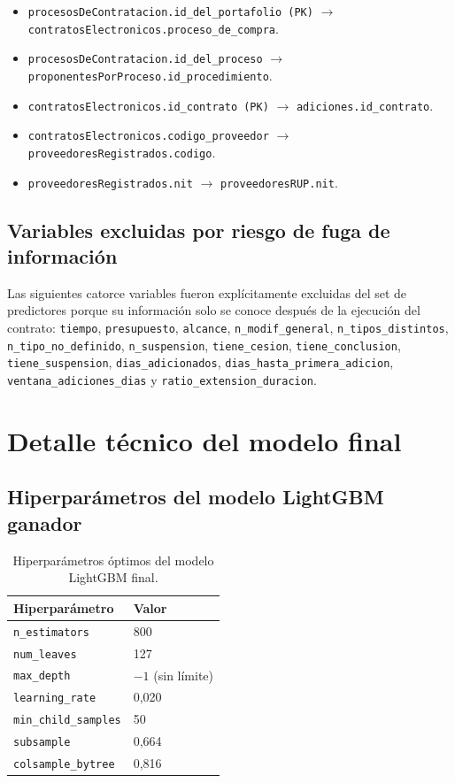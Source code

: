 \documentclass[12pt,letterpaper,oneside]{report}
\begin{document}
\begin{itemize}
    \item \texttt{procesosDeContratacion.id\_del\_portafolio (PK)} $\rightarrow$
    \texttt{contratosElectronicos.proceso\_de\_compra}.
    \item \texttt{procesosDeContratacion.id\_del\_proceso} $\rightarrow$
    \texttt{proponentesPorProceso.id\_procedimiento}.
    \item \texttt{contratosElectronicos.id\_contrato (PK)} $\rightarrow$
    \texttt{adiciones.id\_contrato}.
    \item \texttt{contratosElectronicos.codigo\_proveedor} $\rightarrow$
    \texttt{proveedoresRegistrados.codigo}.
    \item \texttt{proveedoresRegistrados.nit} $\rightarrow$
    \texttt{proveedoresRUP.nit}.
\end{itemize}

\section{Variables excluidas por riesgo de fuga de información}

Las siguientes catorce variables fueron explícitamente excluidas del set de
predictores porque su información solo se conoce después de la ejecución del
contrato: \texttt{tiempo}, \texttt{presupuesto}, \texttt{alcance},
\texttt{n\_modif\_general}, \texttt{n\_tipos\_distintos},
\texttt{n\_tipo\_no\_definido}, \texttt{n\_suspension},
\texttt{tiene\_cesion}, \texttt{tiene\_conclusion},
\texttt{tiene\_suspension}, \texttt{dias\_adicionados},
\texttt{dias\_hasta\_primera\_adicion}, \texttt{ventana\_adiciones\_dias} y
\texttt{ratio\_extension\_duracion}.

\chapter{Detalle técnico del modelo final}
\label{anexo:modelo}

\section{Hiperparámetros del modelo LightGBM ganador}

\begin{table}[h!]
\centering
\caption{Hiperparámetros óptimos del modelo LightGBM final.}
\label{tab:hp_lgbm}
\begin{tabular}{ll}
\toprule
\textbf{Hiperparámetro} & \textbf{Valor} \\
\midrule
\texttt{n\_estimators} & 800 \\
\texttt{num\_leaves} & 127 \\
\texttt{max\_depth} & $-1$ (sin límite) \\
\texttt{learning\_rate} & 0,020 \\
\texttt{min\_child\_samples} & 50 \\
\texttt{subsample} & 0,664 \\
\texttt{colsample\_bytree} & 0,816 \\
\bottomrule
\end{tabular}
\end{table}
\end{document}
